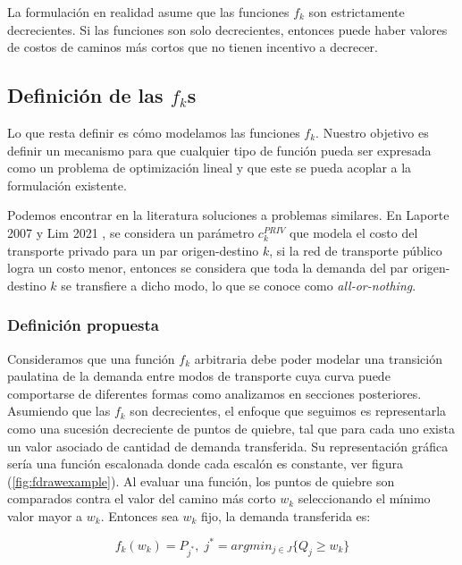 \documentclass{article}
\begin{document}
  La formulación en realidad asume que las funciones $f_k$ son estrictamente decrecientes. Si las funciones son solo decrecientes, entonces puede haber valores de costos de caminos más cortos que no tienen incentivo a decrecer.

  \subsection{Definición de las $f_k$s}

  Lo que resta definir es cómo modelamos las funciones $f_k$. Nuestro objetivo es definir un mecanismo para que cualquier tipo de función pueda ser expresada como un problema de optimización lineal y que este se pueda acoplar a la formulación existente.

  Podemos encontrar en la literatura soluciones a problemas similares. En Laporte 2007 \cite{laporte2007} y Lim 2021 \cite{lim2021}, se considera un parámetro $c^{PRIV}_k$ que modela el costo del transporte privado para un par origen-destino $k$, si la red de transporte público logra un costo menor, entonces se considera que toda la demanda del par origen-destino $k$ se transfiere a dicho modo, lo que se conoce como {\it all-or-nothing}.

  \subsubsection{Definición propuesta}

  Consideramos que una función $f_k$ arbitraria debe poder modelar una transición paulatina de la demanda entre modos de transporte cuya curva puede comportarse de diferentes formas como analizamos en secciones posteriores. Asumiendo que las $f_k$ son decrecientes, el enfoque que seguimos es representarla como una sucesión decreciente de puntos de quiebre, tal que para cada uno exista un valor asociado de cantidad de demanda transferida. Su representación gráfica sería una función escalonada donde cada escalón es constante, ver figura (\ref{fig:fdrawexample}). Al evaluar una función, los puntos de quiebre son comparados contra el valor del camino más corto $w_k$ seleccionando el mínimo valor mayor a $w_k$. Entonces sea $w_k$ fijo, la demanda transferida es:

  \begin{equation}
    \label{eq:deffks}
    f_k(w_k) = P_{j^*},\; j^* = argmin_{j \in J} \{Q_j \geq w_k\}
  \end{equation}
\end{document}
